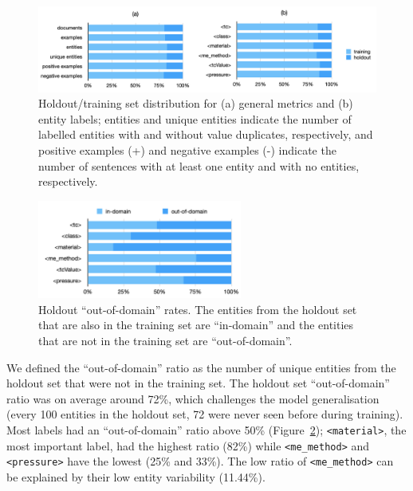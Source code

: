 \begin{figure}[ht]
    \centering
    \includegraphics[width=\textwidth]{figures/automatic_extraction_supercon/superconductor-holdout-training-set}
    \caption{Holdout/training set distribution for (a) general metrics and (b) entity labels; entities and unique entities indicate the number of labelled entities with and without value duplicates, respectively, and positive examples (+) and negative examples (-) indicate the number of sentences with at least one entity and with no entities, respectively.}
    \label{fig:training-holdout-set-distribution}
\end{figure}

\begin{figure}[ht]
    \centering
    \includegraphics[width=0.6\textwidth]{figures/automatic_extraction_supercon/superconductor-out-domain-holdout-unique}
    \caption{Holdout ``out-of-domain'' rates. The entities from the holdout set that are also in the training set are ``in-domain'' and the entities that are not in the training set are ``out-of-domain''.}
    \label{fig:out-domain-holdout}
\end{figure}

We defined the ``out-of-domain'' ratio as the number of unique entities from the holdout set that were not in the training set.
The holdout set ``out-of-domain'' ratio was on average around 72\%, which challenges the model generalisation (every 100 entities in the holdout set, 72 were never seen before during training).
Most labels had an ``out-of-domain'' ratio above 50\%  (Figure~\ref{fig:out-domain-holdout});  \texttt{<material>}, the most important label, had the highest ratio (82\%) while \texttt{<me\_method>} and \texttt{<pressure>} have the lowest (25\% and 33\%). 
The low ratio of \texttt{<me\_method>} can be explained by their low entity variability (11.44\%).

